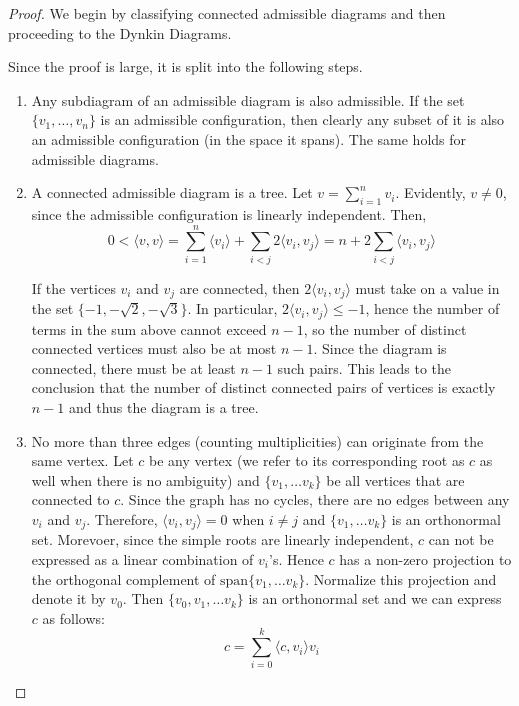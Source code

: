 \begin{proof}
    We begin by classifying connected admissible diagrams and then proceeding to the Dynkin Diagrams. \newline
    
    Since the proof is large, it is split into the following steps.
    \begin{enumerate}
        \item Any subdiagram of an admissible diagram is also admissible. If the set 
        $\{v_1, \dots, v_n \}$ is an admissible configuration, then clearly any subset of it is also an admissible configuration
        (in the space it spans). The same holds for admissible diagrams.
        
        \item A connected admissible diagram is a tree. Let $v = \sum_{i=1}^{n} v_i$. Evidently, $v \not= 0$, since the admissible
        configuration is linearly independent. Then,
            \begin{equation*}
                0 < \langle v, v \rangle = \sum_{i=1}^{n} \langle v_i \rangle + \sum_{i < j} 2 \langle v_i, v_j \rangle = n + 2 \sum_{i < j} \langle v_i, v_j \rangle 
            \end{equation*}
            
        If the vertices $v_i$ and $v_j$ are connected, then $2 \langle v_i, v_j \rangle$ must take on a value in the set
        $\{-1, -\sqrt{2}, -\sqrt{3}\}$. In particular,  $2 \langle v_i, v_j \rangle \leq - 1$, hence the number of terms in the sum above
        cannot exceed $n-1$, so the number of distinct connected vertices must also be at most $n-1$. Since the diagram is connected,
        there must be at least $n-1$ such pairs. This leads to the conclusion that the number of distinct connected pairs of vertices
        is exactly $n-1$ and thus the diagram is a tree.
        
        \item No more than three edges (counting multiplicities) can originate from the same vertex.
        Let $c$ be any vertex (we refer to its corresponding root as $c$ as well when there is no ambiguity)
        and $\{v_1, \dots v_k \}$ be all vertices that are connected to $c$.
        Since the graph has no cycles, there are no edges between any $v_i$ and $v_j$.
        Therefore, $\langle v_i, v_j \rangle = 0$ when $i \not= j$ and $\{v_1, \dots v_k \}$ is an orthonormal set.
        Morevoer, since the simple roots are linearly independent, $c$ can not be expressed as a linear combination of $v_i$'s.
        Hence $c$ has a non-zero projection to the orthogonal complement of $\text{span}\{v_1, \dots v_k\}$.
        Normalize this projection and denote it by $v_0$.
        Then $\{v_0, v_1, \dots v_k \}$ is an orthonormal set and we can express $c$ as follows:
            \begin{equation*}
                c = \sum_{i=0}^k \langle c, v_i \rangle v_i
            \end{equation*}


\end{enumerate}
\end{proof}

